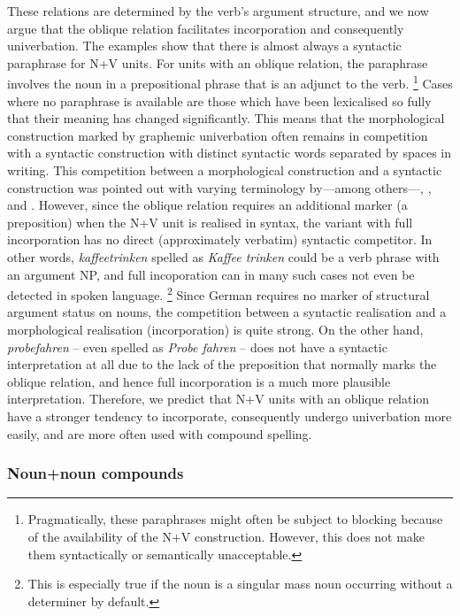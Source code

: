 \documentclass[biblatex, charis, linguex]{glossa}\usepackage{knitr}
\begin{document}
These relations are determined by the verb's argument structure, and we now argue that the oblique relation facilitates incorporation and consequently univerbation.
The examples show that there is almost always a syntactic paraphrase for N+V units.
For units with an oblique relation, the paraphrase involves the noun in a prepositional phrase that is an adjunct to the verb.%
\footnote{Pragmatically, these paraphrases might often be subject to blocking because of the availability of the N+V construction.
However, this does not make them syntactically or semantically unacceptable.}
Cases where no paraphrase is available are those which have been lexicalised so fully that their meaning has changed significantly.
This means that the morphological construction marked by graphemic univerbation often remains in competition with a syntactic construction with distinct syntactic words separated by spaces in writing.
This competition between a morphological construction and a syntactic construction was pointed out with varying terminology by---among others---\citet[12]{FleischerBartz2012}, \citet[13]{Schluecker2012}, and \citet[88]{Morcinek2013}.
However, since the oblique relation requires an additional marker (a preposition) when the N+V unit is realised in syntax, the variant with full incorporation has no direct (approximately verbatim) syntactic competitor.
In other words, \textit{kaffeetrinken} spelled as \textit{Kaffee trinken} could be a verb phrase with an argument NP, and full incoporation can in many such cases not even be detected in spoken language.%
\footnote{This is especially true if the noun is a singular mass noun occurring without a determiner by default.}
Since German requires no marker of structural argument status on nouns, the competition between a syntactic realisation and a morphological realisation (incorporation) is quite strong.
On the other hand, \textit{probefahren} -- even spelled as \textit{Probe fahren} -- does not have a syntactic interpretation at all due to the lack of the preposition that normally marks the oblique relation, and hence full incorporation is a much more plausible interpretation.
Therefore, we predict that N+V units with an oblique relation have a stronger tendency to incorporate, consequently undergo univerbation more easily, and are more often used with compound spelling.

\subsubsection{Noun+noun compounds}
\label{sub:nncompounds}
\label{sub:nvunitsasreluctantcompounds}
\end{document}

